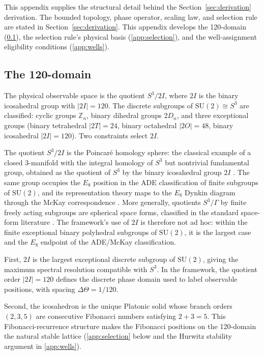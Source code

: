\documentclass[11pt,a4paper]{article}
\numberwithin{equation}{section}
\numberwithin{table}{section}
\numberwithin{figure}{section}
\begin{document}
This appendix supplies the structural detail behind the
Section~\ref{sec:derivation} derivation. The bounded topology, phase
operator, scaling law, and selection rule are stated in
Section~\ref{sec:derivation}. This appendix develops the 120-domain
(\ref{app:120-domain}), the selection rule's physical basis
(\ref{app:selection}), and the well-assignment eligibility conditions
(\ref{app:wells}).

\subsection{The 120-domain}
\label{app:120-domain}

The physical observable space is the quotient $S^3/2I$, where $2I$ is
the binary icosahedral group with $|2I| = 120$. The discrete subgroups
of $\text{SU}(2) \cong S^3$ are classified: cyclic groups
$\mathbb{Z}_n$, binary dihedral groups $2D_n$, and three exceptional
groups (binary tetrahedral $|2T| = 24$, binary octahedral $|2O| = 48$,
binary icosahedral $|2I| = 120$). Two constraints select $2I$.

The quotient $S^3/2I$ is the Poincar{\'e} homology sphere: the
classical example of a closed 3-manifold with the integral homology of
$S^3$ but nontrivial fundamental group, obtained as the quotient of
$S^3$ by the binary icosahedral group $2I$ \citep{Saveliev2012}. The
same group occupies the $E_8$ position in the ADE classification of
finite subgroups of $\text{SU}(2)$, and its representation theory maps
to the $E_8$ Dynkin diagram through the McKay correspondence
\citep{McKay1980}. More generally, quotients $S^3/\Gamma$ by finite
freely acting subgroups are spherical space forms, classified in the
standard space-form literature \citep{Wolf2011}. The framework's use of
$2I$ is therefore not ad hoc: within the finite exceptional binary
polyhedral subgroups of $\text{SU}(2)$, it is the largest case and the
$E_8$ endpoint of the ADE/McKay classification.

First, $2I$ is the largest exceptional discrete subgroup of
$\text{SU}(2)$, giving the maximum spectral resolution compatible with
$S^3$. In the framework, the quotient order $|2I| = 120$ defines the
discrete phase domain used to label observable positions, with spacing
$\Delta\Theta = 1/120$.

Second, the icosahedron is the unique Platonic solid whose branch
orders $(2, 3, 5)$ are consecutive Fibonacci numbers satisfying
$2 + 3 = 5$. This Fibonacci-recurrence structure makes the Fibonacci
positions on the 120-domain the natural stable lattice
(\ref{app:selection} below and the Hurwitz stability argument in
\ref{app:wells}).
\end{document}
